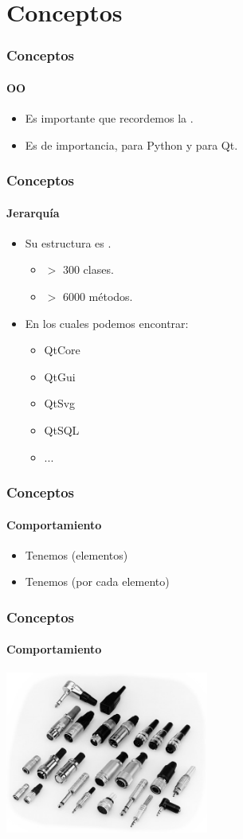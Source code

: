 \section{Conceptos}
\frame
{
\frametitle{Conceptos}
\framesubtitle{OO}
\begin{itemize}
	\item Es importante que recordemos la .
	\item Es de  importancia, para Python y para Qt.
\end{itemize}
}

\frame
{
\frametitle{Conceptos}
\framesubtitle{Jerarquía}
\begin{itemize}
	\item Su estructura es .
	\begin{itemize}
		\item $>$ 300 clases.
		\item $>$ 6000 métodos.
	\end{itemize}
	\item En los cuales podemos encontrar:
	\begin{itemize}
		\item QtCore
		\item QtGui
		\item QtSvg
		\item QtSQL
		\item ...
	\end{itemize}
\end{itemize}
}

\frame
{
\frametitle{Conceptos}
\framesubtitle{Comportamiento}
\begin{itemize}
	\item Tenemos  (elementos)
	\item Tenemos  (por cada elemento) 
\end{itemize}
}

\frame
{
\frametitle{Conceptos}
\framesubtitle{Comportamiento}
\begin{center}
	\includegraphics[width=0.5\textwidth]{img/tipos}
\end{center}
}

